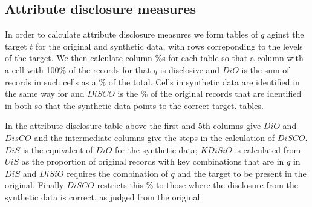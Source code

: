 \documentclass[12pt]{article}
\begin{document}
\subsection{Attribute disclosure measures}\label{subsec:attrib} 
In order to calculate attribute disclosure measures we form tables of $q$ aginst the target $t$ for the original and synthetic data, with rows correponding to the levels of the target. We then calculate column \%s for each table so that a column with a cell with 100\% of the records for that $q$ is disclosive and  $DiO$ is the sum of records in such cells as a \% of the total.  Cells in synthetic data are identified in the same way for and  $DiSCO$ is the \% of the original records that are identified in both so that the synthetic data points to the correct target.
tables.

In the attribute disclosure table above the first and 5th columns give $DiO$ and $DisCO$ and the intermediate columns give the steps in the calculation of $DiSCO$. $DiS$ is the equivalent of $DiO$ for the synthetic data; $KDiSiO$ is calculated from $UiS$ as the proportion of original records with key combinations that are in $q$ in $DiS$  and  $DiSiO$ requires the combination of $q$ and the target to be present in
the original. Finally $DiSCO$ restricts this \% to those where the disclosure from the synthetic data is correct, as judged from the original.
\end{document}
